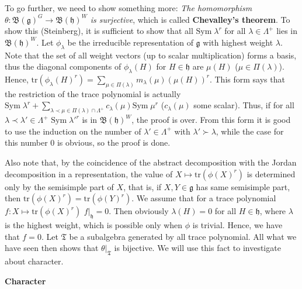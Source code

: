\documentclass{article}
\newcommand{\tr}[1]{\mathrm{tr}#1}
\newcommand{\lie}[1]{\mathfrak{#1}}
\begin{document}
To go further, we need to show something more: \textit{The homomorphism $\theta : \mathfrak{B}(\lie{g})^G \to \mathfrak{B}(\lie{h})^W$ is surjective}, which is called \textbf{Chevalley's theorem}.
To show this (Steinberg), it is sufficient to show that all $\textrm{Sym}\; \lambda^r$ for all $\lambda \in \Lambda^+$ lies in $\mathfrak{B}(\lie{h})^W$.
Let $\phi_\lambda$ be the irreducible representation of $\lie{g}$ with highest weight $\lambda$.
Note that the set of all weight vectors (up to scalar multiplication) forms a basis, thus the diagonal components of $\phi_\lambda(H)$ for $H \in \lie{h}$ are $\mu(H)$ ($\mu \in \Pi(\lambda)$).
Hence, $\tr{(\phi_\lambda(H)^r)} = \sum_{\mu \in \Pi(\lambda)} m_\lambda(\mu) (\mu(H))^r$.
This form says that the restriction of the trace polynomial is actually $\textrm{Sym}\; \lambda^r + \sum_{\lambda \prec \mu \in \Pi(\lambda) \cap \Lambda^+} c_\lambda(\mu) \textrm{Sym}\; \mu^r$ ($c_\lambda(\mu)$ some scalar).
Thus, if for all $\lambda \prec \lambda' \in \Lambda^+$ $\textrm{Sym}\; \lambda'^r$ is in $\mathfrak{B}(\lie{h})^W$, the proof is over.
From this form it is good to use the induction on the number of $\lambda' \in \Lambda^+$ with $\lambda' \succ \lambda$, while the case for this number 0 is obvious, so the proof is done.

Also note that, by the coincidence of the abstract decomposition with the Jordan decomposition in a representation, the value of $X \mapsto \tr{(\phi(X)^r)}$ is determined only by the semisimple part of $X$, that is, if $X, Y \in \lie{g}$ has same semisimple part, then $\tr{(\phi(X)^r)} = \tr{(\phi(Y)^r)}$.
We assume that for a trace polynomial $f : X \mapsto \tr{(\phi(X)^r)}$ $f|_\lie{h} = 0$.
Then obviously $\lambda(H) = 0$ for all $H \in \lie{h}$, where $\lambda$ is the highest weight, which is possible only when $\phi$ is trivial.
Hence, we have that $f = 0$.
Let $\mathfrak{T}$ be a subalgebra generated by all trace polynomial.
All what we have seen then shows that $\theta|_\mathfrak{T}$ is bijective.
We will use this fact to investigate about character.

\newpage

\textbf{Character}
\end{document}

